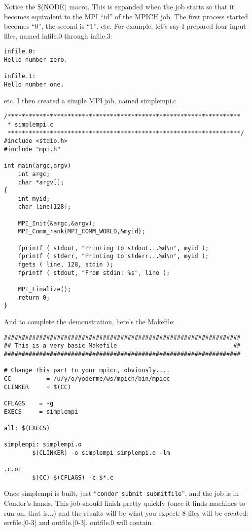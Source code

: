Notice the \$(NODE) macro.  This is expanded when the job starts so that
it becomes equivalent to the MPI ``id'' of the MPICH job.  The first 
process started becomes ``0'', the second is ``1'', etc.  For example, 
let's say I prepared four input files, named infile.0 through infile.3:

\begin{verbatim}
infile.0: 
Hello number zero.

infile.1: 
Hello number one.
\end{verbatim}

etc.  I then created a simple MPI job, named simplempi.c

\begin{verbatim}
/******************************************************************
 * simplempi.c
 ******************************************************************/
#include <stdio.h>
#include "mpi.h"

int main(argc,argv)
    int argc;
    char *argv[];
{
    int myid;
    char line[128];

    MPI_Init(&argc,&argv);
    MPI_Comm_rank(MPI_COMM_WORLD,&myid);

    fprintf ( stdout, "Printing to stdout...%d\n", myid );
    fprintf ( stderr, "Printing to stderr...%d\n", myid );
    fgets ( line, 128, stdin );
    fprintf ( stdout, "From stdin: %s", line );

    MPI_Finalize();
    return 0;
}
\end{verbatim}

And to complete the demonstration, here's the Makefile:

\begin{verbatim}
###################################################################
## This is a very basic Makefile                                 ##
###################################################################

# Change this part to your mpicc, obviously....
CC          = /u/y/o/yoderme/ws/mpich/bin/mpicc
CLINKER     = $(CC)

CFLAGS    = -g
EXECS     = simplempi

all: $(EXECS)

simplempi: simplempi.o
        $(CLINKER) -o simplempi simplempi.o -lm

.c.o:
        $(CC) $(CFLAGS) -c $*.c
\end{verbatim}

Once simplempi is built, just ``{\tt condor\_submit submitfile}'', and 
the job is in Condor's hands.  This job should finish pretty quickly
(once it finds machines to run on, that is...) and the results will
be what you expect:  8 files will be created:  errfile.[0-3]
and outfile.[0-3].  outfile.0 will contain

